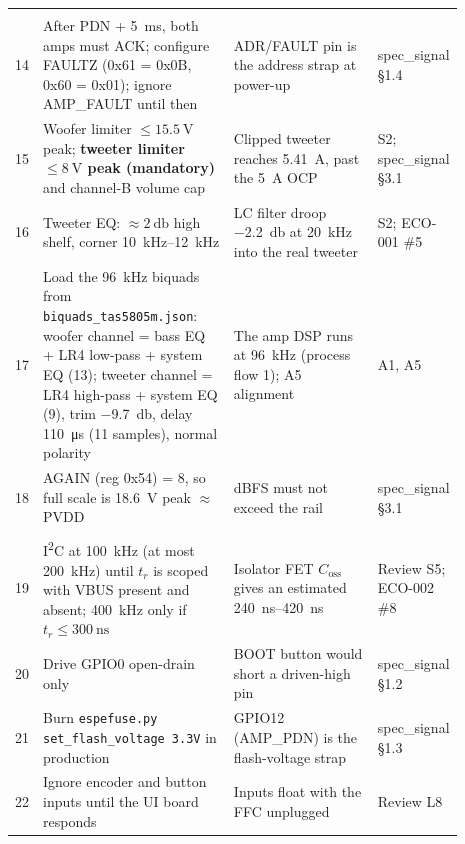{\begin{longtable}{@{}r >{\raggedright\arraybackslash}p{0.43\linewidth} >{\raggedright\arraybackslash}p{0.33\linewidth} >{\raggedright\arraybackslash}p{0.13\linewidth}@{}}
\addlinespace
\multicolumn{4}{@{}l}{\textbf{Amplifiers (TAS5805M, 0x2C/0x2D)}} \\
14 & After PDN + \qty{5}{\milli\second}, both amps must ACK; configure FAULTZ (0x61 = 0x0B, 0x60 = 0x01); ignore AMP\_FAULT until then & ADR/FAULT pin is the address strap at power-up & spec\_signal §1.4 \\
15 & Woofer limiter $\le\qty{15.5}{\volt}$ peak; \textbf{tweeter limiter $\le\qty{8}{\volt}$ peak (mandatory)} and channel-B volume cap & Clipped tweeter reaches \qty{5.41}{\ampere}, past the \qty{5}{\ampere} OCP & S2; spec\_signal §3.1 \\
16 & Tweeter EQ: $\approx\qty{+2}{\decibel}$ high shelf, corner \qtyrange{10}{12}{\kilo\hertz} & LC filter droop \qty{-2.2}{\decibel} at \qty{20}{\kilo\hertz} into the real tweeter & S2; ECO-001 \#5 \\
17 & Load the \qty{96}{\kilo\hertz} biquads from \texttt{biquads\_tas5805m.json}: woofer channel = bass EQ + LR4 low-pass + system EQ (13); tweeter channel = LR4 high-pass + system EQ (9), trim \qty{-9.7}{\decibel}, delay \qty{110}{\micro\second} (11 samples), normal polarity & The amp DSP runs at \qty{96}{\kilo\hertz} (process flow 1); A5 alignment & A1, A5 \\
18 & AGAIN (reg 0x54) = 8, so full scale is \qty{18.6}{\volt} peak $\approx$ PVDD & 0 dBFS must not exceed the rail & spec\_signal §3.1 \\
\addlinespace
\multicolumn{4}{@{}l}{\textbf{MCU and buses}} \\
19 & I\textsuperscript{2}C at \qty{100}{\kilo\hertz} (at most \qty{200}{\kilo\hertz}) until $t_r$ is scoped with VBUS present and absent; \qty{400}{\kilo\hertz} only if $t_r\le\qty{300}{\nano\second}$ & Isolator FET $C_\text{oss}$ gives an estimated \qtyrange{240}{420}{\nano\second} & Review S5; ECO-002 \#8 \\
20 & Drive GPIO0 open-drain only & BOOT button would short a driven-high pin & spec\_signal §1.2 \\
21 & Burn \texttt{espefuse.py set\_flash\_voltage 3.3V} in production & GPIO12 (AMP\_PDN) is the flash-voltage strap & spec\_signal §1.3 \\
22 & Ignore encoder and button inputs until the UI board responds & Inputs float with the FFC unplugged & Review L8 \\
\end{longtable}
}
